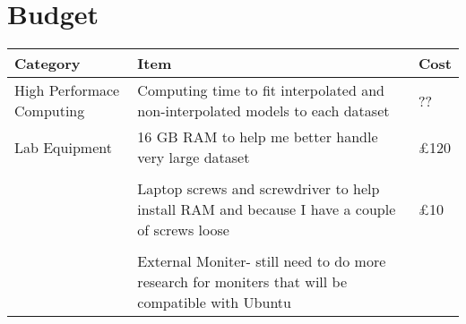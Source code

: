 \documentclass[11pt, a4paper]{article}
\begin{document}
\section{Budget}

\begin{center}
\begin{tabularx}{7in}{ L{0.6} | L{1.2} | L{0.2} }
	\textbf{Category} & \textbf{Item} & \textbf{Cost} \\\hline
	High Performace Computing & Computing time to fit interpolated and non-interpolated models to each dataset & ?? \\\hline
	Lab Equipment & 16 GB RAM to help me better handle very large dataset & £120 \\\\
	
	 & Laptop screws and screwdriver to help install RAM and because I have a couple of screws loose & £10 \\\\
	 
	 & External Moniter- still need to do more research for moniters that will be compatible with Ubuntu 
	
\end{tabularx}
\end{center}
\end{document}
